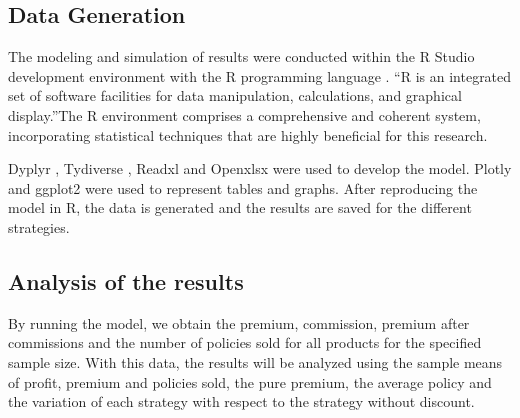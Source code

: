 \documentclass[review]{elsarticle}
\begin{document}
\subsection{Data Generation}

The modeling and simulation of results  were conducted within the R Studio development environment \cite{posit2023rstudio} with the R programming language \cite{rcoreteam2023r}.
“R is an integrated set of software facilities for data manipulation, calculations, and graphical display.”The R environment comprises a comprehensive and coherent system, incorporating statistical techniques that are highly beneficial for this research.

Dyplyr \cite{wickham2023dplyr}, Tydiverse \cite{wickham2019welcome}, Readxl \cite{wickham2023readxl} and Openxlsx \cite{schauberger2023openxlsx} were used to develop the model. Plotly \cite{sievert2020interactive} and ggplot2 \cite{wickham2016ggplot2} were used to represent tables and graphs.
After reproducing the model in R, the data is generated and the results are saved for the different strategies.

\subsection{Analysis of the results}

By running the model, we obtain the premium, commission, premium after commissions and the number of policies sold for all products for the specified sample size.
With this data, the results will be analyzed using the sample means of profit, premium and policies sold, the pure premium, the average policy and the variation of each strategy with respect to the strategy without discount.
\end{document}
